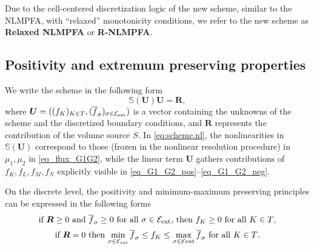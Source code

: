 \documentclass[final,11pt]{elsarticle}
\def\edges{{\mathcal E}}
\begin{document}
Due to the cell-centered discretization logic of the new scheme, similar to the NLMPFA, with ``relaxed'' monotonicity conditions, we refer to the new scheme as \textbf{Relaxed NLMPFA} or \textbf{R-NLMPFA}.

\subsection{Positivity and extremum preserving properties}

We write the scheme in the following form 
\begin{equation}\label{eq:scheme.nl}
    \mathbb{S}(\boldsymbol{U})\boldsymbol{U}=\boldsymbol{R},
\end{equation}
where $\boldsymbol{U}=((f_K)_{K\in T},(\overline{f}_\sigma)_{\sigma\in \edges_{\rm ext}})$ is a vector containing the unknowns of the scheme and the discretized boundary conditions, and $\boldsymbol{R}$ represents the contribution of the volume source $S$. In \eqref{eq:scheme.nl}, the nonlinearities in $\mathbb{S}(\boldsymbol{U})$ correspond to those (frozen in the nonlinear resolution procedure) in $\mu_1,\mu_2$ in \eqref{eq_flux_G1G2}, while the linear term $\boldsymbol{U}$ gathers contributions of $f_K,f_L,f_M,f_N$ explicitly visible in \eqref{eq_G1_G2_pos}--\eqref{eq_G1_G2_neg}.

On the discrete level, the positivity and minimum-maximum preserving principles can be expressed in the following forms
\begin{equation}
\text{if $\boldsymbol{R}\geq 0$ and $\overline{f}_\sigma\geq 0$ for all $\sigma\in \edges_{\rm ext}$, then $f_K\geq 0$ for all $K\in T$},
\label{eq_positivity_principle}
\end{equation}
\begin{equation}
\text{if $\boldsymbol{R}=0$ then $\min_{\sigma\in \edges_{\rm ext}}\overline{f}_\sigma\leq f_K\leq \max_{\sigma\in \edges \rm ext}\overline{f}_\sigma$ for all $K\in T$.}
\label{eq_minimum_maximum_principle}
\end{equation}
\end{document}
